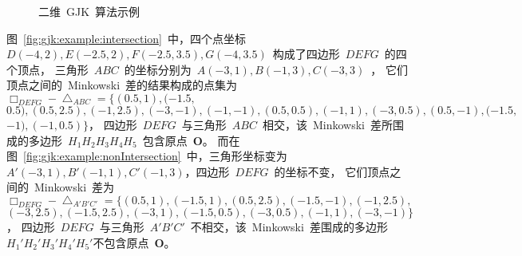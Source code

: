 \begin{figure}[htbp]
\centering
{} 
\caption{二维~GJK~算法示例}
\label{fig:gjk:example:2d}
\end{figure}

图~\ref{fig:gjk:example:intersection}~中，四个点坐标~$D(-4, 2), E(-2.5, 2), F(-2.5, 3.5), G(-4, 3.5)$~构成了四边形~$DEFG$~的四个顶点，
三角形~$ABC$~的坐标分别为~$A(-3, 1), B(-1,3), C(-3, 3)$~，
它们顶点之间的~Minkowski~差的结果构成的点集为~$\Box_{DEFG} - \bigtriangleup_{ABC} = \{  (0.5, 1),  (-1.5, $\\$0.5),  (0.5, 2.5), (-1, 2.5),  (-3, -1), (-1, -1),  (0.5, 0.5), (-1, 1),  (-3, 0.5),  (0.5, -1), (-1.5, $\\$-1), (-1, 0.5) \}$，
四边形~$DEFG$~与三角形~$ABC$~相交，该~Minkowski~差所围成的多边形~$H_1H_2H_3H_4H_5$~包含原点~$\bm{O}$。
而在图~\ref{fig:gjk:example:nonIntersection}~中，三角形坐标变为~$A'(-3, 1), B'(-1, 1), C'(-1,3)$，四边形~$DEFG$~的坐标不变，
它们顶点之间的~Minkowski~差为~$\Box_{DEFG} - \bigtriangleup_{A'B'C'} = \{  (0.5, 1), (-1.5, 1),  (0.5, 2.5)  , (-1.5, -1),  (-1, 2.5), $\\$ (-3, 2.5),  (-1.5, 2.5), (-3, 1), (-1.5, 0.5), (-3, 0.5), (-1, 1),(-3, -1) \}$，
四边形~$DEFG$~与三角形~$A'B'C'$~不相交，该~Minkowski~差围成的多边形~$H_1'H_2'H_3'H_4'H_5'$不包含原点~$\bm{O}$。

